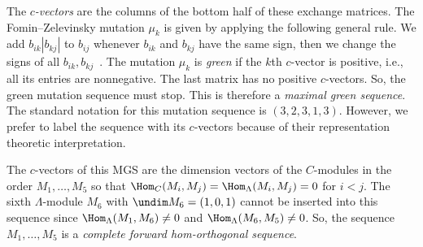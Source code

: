 The \emph{$c$-vectors} are the columns of the bottom half of these exchange matrices. The Fomin--Zelevinsky mutation $\mu_k$ is given by applying the following general rule. We add $b_{ik}|b_{kj}|$ to $b_{ij}$ whenever $b_{ik}$ and $b_{kj}$ have the same sign, then we change the signs of all $b_{ik},b_{kj}$~\cite{FZ4}. The mutation $\mu_k$ is \emph{green} if the $k$th $c$-vector is positive, i.e., all its entries are nonnegative. The last matrix has no positive $c$-vectors. So, the green mutation sequence must stop. This is therefore a \emph{maximal green sequence}. The standard notation for this mutation sequence is $(3,2,3,1,3)$. However, we prefer to label the sequence with its $c$-vectors because of their representation theoretic interpretation.


The $c$-vectors of this MGS are the dimension vectors of the $C$-modules in the order $M_1,\ldots,M_5$ so that $\Hom_{C}(M_i,M_j)=\Hom_{\Lambda}(M_i,M_j)=0$ for $i<j$. The sixth $\Lambda$-module $M_6$ with $\undim M_6=(1,0,1)$ cannot be inserted into this sequence since $\Hom_\Lambda(M_1,M_6)\neq 0$ and $\Hom_\Lambda(M_6,M_5)\neq 0$. So, the sequence $M_1,\ldots,M_5$ is a \emph{complete forward hom-orthogonal sequence}.

